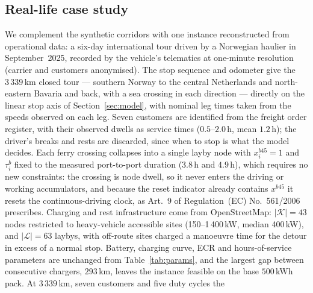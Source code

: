 %

\subsection{Real-life case study}
\label{sec:casestudy}

We complement the synthetic corridors with one instance reconstructed from
operational data: a six-day international tour driven by a Norwegian haulier in
September~2025, recorded by the vehicle's telematics at one-minute resolution
(carrier and customers anonymised).  The stop sequence and odometer give the
$3\,339$\,km closed tour --- southern Norway to the central Netherlands and
north-eastern Bavaria and back, with a sea crossing in each direction --- directly on the
linear stop axis of Section~\ref{sec:model}, with nominal leg times taken from
the speeds observed on each leg.  Seven customers are identified from the
freight order register, with their observed dwells as service times
($0.5$--$2.0$\,h, mean $1.2$\,h); the driver's breaks and rests are discarded,
since when to stop is what the model decides.  Each ferry crossing collapses
into a single layby node with $x^{b45}_i=1$ and $\tau^b_i$ fixed to the
measured port-to-port duration ($3.8$\,h and $4.9$\,h), which requires no new
constraints: the crossing is node dwell, so it never enters the driving or
working accumulators, and because the reset indicator already contains
$x^{b45}$ it resets the continuous-driving clock, as Art.~9 of
Regulation~(EC) No.~561/2006 prescribes.  Charging and rest infrastructure come
from OpenStreetMap: $|\mathcal K|=43$ nodes restricted to heavy-vehicle
accessible sites (150--1\,400\,kW, median 400\,kW), and $|\mathcal L|=63$
laybys, with off-route sites charged a manoeuvre time for the detour in excess
of a normal stop.  Battery, charging curve, ECR and hours-of-service parameters
are unchanged from Table~\ref{tab:params}, and the largest gap between
consecutive chargers, $293$\,km, leaves the instance feasible on the base
$500$\,kWh pack.  At $3\,339$\,km, seven customers and five duty cycles the
